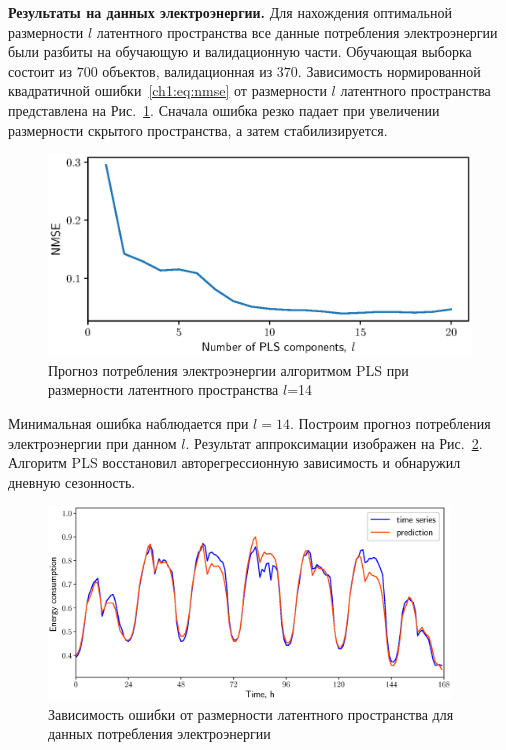 \textbf{Результаты на данных электроэнергии.}
Для нахождения оптимальной размерности $l$ латентного пространства все данные потребления электроэнергии были разбиты на обучающую и валидационную части. 
Обучающая выборка состоит из $700$ объектов, валидационная из $370$. Зависимость нормированной квадратичной ошибки~\eqref{ch1:eq:nmse} от размерности $l$ латентного пространства представлена на Рис.~\ref{ch1:fig:energy_n_comp}. 
Сначала ошибка резко падает при увеличении размерности скрытого пространства, а затем стабилизируется.

\begin{figure}[ht]
	\centering
	\includegraphics[width=0.75\linewidth]{figs/ch1/energy_n_comp}
	\caption{Прогноз потребления электроэнергии алгоритмом PLS при размерности латентного пространства $l$=14}
	\label{ch1:fig:energy_n_comp}
\end{figure}

Минимальная ошибка наблюдается при $l=14$. 
Построим прогноз потребления электроэнергии при данном $l$. 
Результат аппроксимации изображен на Рис.~\ref{ch1:fig:energy_prediction}. Алгоритм PLS восстановил авторегрессионную зависимость и обнаружил дневную сезонность.

\begin{figure}[ht]
	\centering
	\includegraphics[width=0.95\textwidth]{figs/ch1/energy_prediction}
	\caption{Зависимость ошибки от размерности латентного пространства для данных потребления электроэнергии}
	\label{ch1:fig:energy_prediction}
\end{figure}

